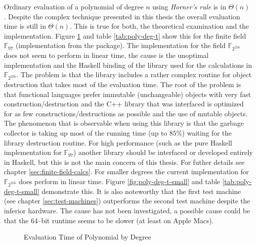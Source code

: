Ordinary evaluation of a polynomial of degree $n$ using \emph{Horner's rule} is
in $\Theta(n)$ \cite{cormen01}. Despite the complex technique presented in this
thesis the overall evaluation time is still in $\Theta(n)$. This is true for
both, the theoretical examination and the implementation. Figure
\ref{fig:poly-deg-t} and table \ref{tab:poly-deg-t} show this for the finite
field $\mathbb{F}_{97}$ (implementation from the \JWTLhaskellForMaths{}
package). The implementation for the field $\mathbb{F}_{2^{256}}$ does not seem
to perform in linear time, the cause is the unoptimal implementation and the
Haskell binding of the library used for the calculations in
$\mathbb{F}_{2^{256}}$. The problem is that the library includes a rather
complex routine for object destruction that takes most of the evaluation time.
The root of the problem is that functional languages prefer immutable
(unchangeable) objects with very fast construction/destruction and the C++
library that was interfaced is optimized for as few constructions/destructions
as possible and the use of mutable objects. The phenomenon that is observable
when using this library is that the garbage collector is taking up most of the
running time (up to $85\%$) waiting for the library destruction routine. For
high performance (such as the pure Haskell implementation for $\mathbb{F}_{97}$)
another library should be interfaced or developed entirely in Haskell, but this
is not the main concern of this thesis. For futher details see chapter
\ref{sec:finite-field-calcs}. For smaller degrees the current implementation for
$\mathbb{F}_{2^{256}}$ does perform in linear time. Figure
\ref{fig:poly-deg-t-small} and table \ref{tab:poly-deg-t-small} demonstrate
this. It is also noteworthy that the first test machine (see chapter
\ref{sec:test-machines}) outperforms the second test machine despite the
inferior hardware. The cause has not been investigated, a possible cause could
be that the 64--bit \JWTghc{} runtime seems to be slower (at least on Apple
Macs)\cite{lentczner11}.


\begin{figure}[ht]
  \centering
  
  \caption{Evaluation Time of Polynomial by Degree}
  \label{fig:poly-deg-t}
\end{figure}

